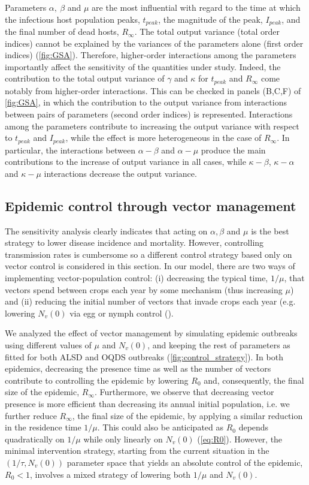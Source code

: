 Parameters $\alpha, \ \beta$ and $\mu$ are the most influential with regard
to the time at which the infectious host population peaks, $t_{peak}$, the
magnitude of the peak, $I_{peak}$, and the final number of dead hosts,
$R_{\infty}$. The total output variance (total order indices) cannot be
explained by the variances of the parameters alone (first order indices)
(\cref{fig:GSA}). Therefore, higher-order interactions among the parameters
importantly affect the sensitivity of the quantities under study. Indeed, the
contribution to the total output variance of $\gamma$ and $\kappa$ for
$t_{peak}$ and $R_{\infty}$ come notably from higher-order interactions. This
can be checked in panels (B,C,F) of \cref{fig:GSA}, in which the contribution
to the output variance from interactions between pairs of parameters (second
order indices) is represented. Interactions among the parameters contribute to
increasing the output variance with respect to $t_{peak}$ and $I_{peak}$, while
the effect is more heterogeneous in the case of $R_{\infty}$. In particular,
the interactions between $\alpha-\beta$ and $\alpha-\mu$ produce the main
contributions to the increase of output variance in all cases, while
$\kappa-\beta$, $\kappa-\alpha$ and $\kappa-\mu$ interactions decrease the
output variance.

\subsection{Epidemic control through vector management}

The sensitivity analysis clearly indicates that acting on $\alpha,\beta$
and $\mu$ is the best strategy to lower disease incidence and mortality.
However, controlling transmission rates is cumbersome so a different control
strategy based only on vector control is considered in this section. In our
model, there are two ways of implementing vector-population control: (i)
decreasing the typical time, $1/\mu$, that vectors spend between crops each
year by some mechanism (thus increasing $\mu$) and (ii) reducing the initial
number of vectors that invade crops each year (e.g. lowering $N_v(0)$ via egg
or nymph control (\cite{Lago2022}).

We analyzed the effect of vector management by simulating epidemic
outbreaks using different values of $\mu$ and $N_v(0)$, and keeping the rest of
parameters as fitted for both ALSD and OQDS outbreaks
(\cref{fig:control_strategy}). In both epidemics, decreasing the presence time
as well as the number of vectors contribute to controlling the epidemic by
lowering $R_0$ and, consequently, the final size of the epidemic, $R_{\infty}$.
Furthermore, we observe that decreasing vector presence is more efficient than
decreasing its annual initial population, i.e. we further reduce $R_{\infty}$,
the final size of the epidemic, by applying a similar reduction in the
residence time $1/\mu$. This could also be anticipated as $R_0$ depends
quadratically on $1/\mu$ while only linearly on $N_v(0)$ (\cref{eq:R0}).
However, the minimal intervention strategy, starting from the current situation
in the $(1/\tau,N_v(0))$ parameter space that yields an absolute control of the
epidemic, $R_0<1$, involves a mixed strategy of lowering both $1/\mu$ and
$N_v(0)$.

